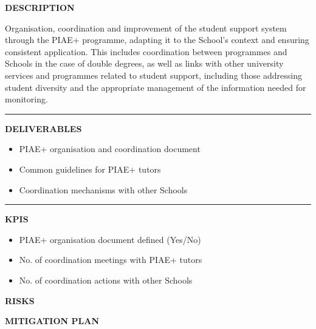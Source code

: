\documentclass[11pt,a4paper]{scrreprt}
\newcommand{\fieldlabel}[1]{%
  {\footnotesize\sffamily\bfseries\color{mutedcolor}\MakeUppercase{#1}}\par\nopagebreak[4]
}
\newcommand{\fieldsep}{\vspace{3pt}\noindent\textcolor{bordercolor}{\rule{\linewidth}{0.4pt}}\vspace{3pt}\par}
\begin{document}
\begin{tcolorbox}[pabox={e360color}{A.P.2.1 \enspace\textbullet\enspace Organisation and Coordination of the Student Support System (PIAE+)}]

\fieldlabel{Description}
{\small Organisation, coordination and improvement of the student support system through the PIAE+ programme, adapting it to the School's context and ensuring consistent application. This includes coordination between programmes and Schools in the case of double degrees, as well as links with other university services and programmes related to student support, including those addressing student diversity and the appropriate management of the information needed for monitoring.  }\par
\fieldsep
\fieldlabel{Deliverables}
{\small \begin{itemize}[noitemsep,topsep=2pt]
\item PIAE+ organisation and coordination document
\item Common guidelines for PIAE+ tutors
\item Coordination mechanisms with other Schools
\end{itemize}}\par
\fieldsep
\fieldlabel{KPIs}
{\small \begin{itemize}[noitemsep,topsep=2pt]
\item PIAE+ organisation document defined (Yes/No)
\item No. of coordination meetings with PIAE+ tutors
\item No. of coordination actions with other Schools
\end{itemize}}\par
\end{tcolorbox}
\begin{tcolorbox}[riskbox]
{\footnotesize\sffamily\bfseries\color{red!50!black} RISKS}\par{}
\end{tcolorbox}
\begin{tcolorbox}[mitbox]
{\footnotesize\sffamily\bfseries\color{green!40!black} MITIGATION PLAN}\par{}
\end{tcolorbox}
\vspace{8pt}
\end{document}
